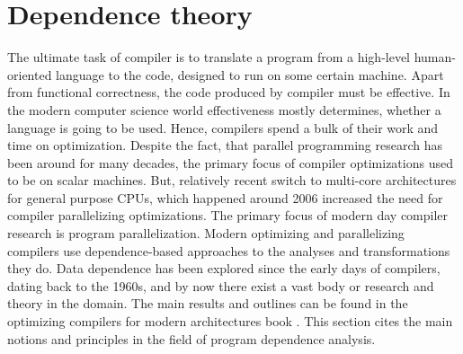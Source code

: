 \section{Dependence theory} 
\label{background-dependence-theory}
\qquad The ultimate task of compiler is to translate a program from a high-level human-oriented language to the code, designed to run on some certain machine. Apart from functional correctness, the code produced by compiler must be effective. In the modern computer science world effectiveness mostly determines, whether a language is going to be used. Hence, compilers spend a bulk of their work and time on optimization.\newline
\null\qquad Despite the fact, that parallel programming research has been around for many decades, the primary focus of compiler optimizations used to be on scalar machines. But, relatively recent switch to multi-core architectures for general purpose CPUs, which happened around 2006 increased the need for compiler parallelizing optimizations.\newline
\null\qquad The primary focus of modern day compiler research is program parallelization. Modern optimizing and parallelizing compilers use dependence-based approaches to the analyses and transformations they do. Data dependence has been explored since the early days of compilers, dating back to the 1960s, and by now there exist a vast body or research and theory in the domain. The main results and outlines can be found in the optimizing compilers for modern architectures book \cite{optimizing-compilers-book}. This section cites the main notions and principles in the field of program dependence analysis.

